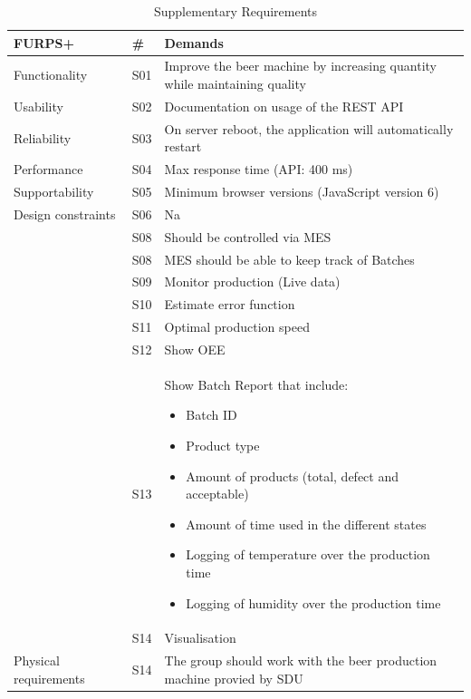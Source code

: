 \begin{table}[ht]
    \begin{tabularx}{\textwidth}{|>{\RaggedRight}p{5.25cm}|>{\RaggedRight}p{0.6cm}|>{\RaggedRight}X|}
        \hline
        \textbf{FURPS+}  & \textbf{\#} & \textbf{Demands} \\
        \hline
        Functionality  	& S01 & Improve the beer machine by increasing quantity while maintaining quality \\
        \hline
        Usability      	& S02 & Documentation on usage of the REST API \\
        \hline
        Reliability    	& S03 & On server reboot, the application will automatically restart \\
        \hline
        Performance    	& S04 & Max response time (API: 400 ms) \\
        \hline
        Supportability 	& S05 & Minimum browser versions (JavaScript version 6)\\
        \hline
        Design constraints 	& S06 & Na \\
        \hline
        \multirow{5}{*}{Implementation requirements} & S08 & Should be controlled via MES\\
        \cline{2-3}
                & S08 & MES should be able to keep track of Batches\\
        \cline{2-3}
                & S09 & Monitor production (Live data)\\
        \cline{2-3}
                & S10 & Estimate error function\\
        \cline{2-3}
                & S11 & Optimal production speed\\
        \hline
        \multirow{14}{*}{Interface requirements } & S12 & Show OEE \\
        \cline{2-3}
                & S13 & Show Batch Report that include:
            \begin{itemize}
                \item Batch ID
                \item Product type
                \item Amount of products (total, defect and acceptable)
                \item Amount of time used in the different states
                \item Logging of temperature over the production time
                \item Logging of humidity over the production time
            \end{itemize} \\
        \cline{2-3}
            & S14 & Visualisation \\
        \hline
        Physical requirements & S14 & The group should work with the beer 
        production machine provied by SDU \\
        \hline
    \end{tabularx}
    \caption{Supplementary Requirements} 
    \label{table:sup_requirements}
\end{table} 

